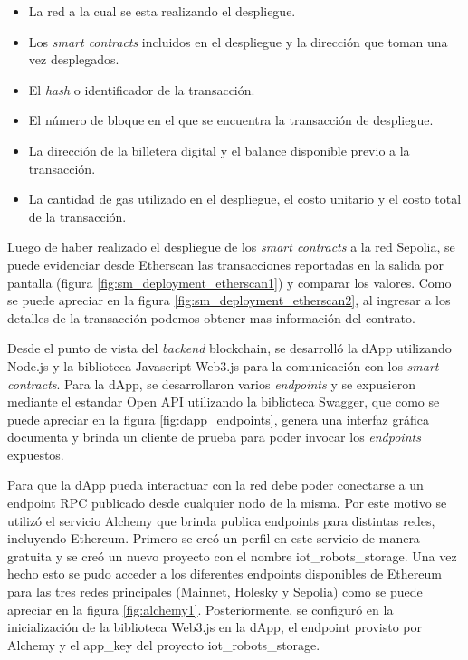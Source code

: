 \begin{itemize}
	\item La red a la cual se esta realizando el despliegue.
	\item Los \textit{smart contracts} incluidos en el despliegue y la dirección que toman una vez desplegados. 
	\item El \textit{hash} o identificador de la transacción.
	\item El número de bloque en el que se encuentra la transacción de despliegue.
	\item La dirección de la billetera digital y el balance disponible previo a la transacción.
	\item La cantidad de gas utilizado en el despliegue, el costo unitario y el costo total de la transacción.
\end{itemize}

Luego de haber realizado el despliegue de los \textit{smart contracts} a la red Sepolia, se puede evidenciar desde Etherscan las transacciones reportadas en la salida por pantalla (figura \ref{fig:sm_deployment_etherscan1}) y comparar los valores. Como se puede apreciar en la figura \ref{fig:sm_deployment_etherscan2}, al ingresar a los detalles de la transacción podemos obtener mas información del contrato.


Desde el punto de vista del \textit{backend} blockchain, se desarrolló la dApp utilizando Node.js y la biblioteca Javascript Web3.js para la comunicación con los \textit{smart contracts}. Para la dApp, se desarrollaron varios \textit{endpoints} y se expusieron mediante el estandar Open API \citep{open_api} utilizando la biblioteca Swagger, que como se puede apreciar en la figura \ref{fig:dapp_endpoints}, genera una interfaz gráfica documenta y brinda un cliente de prueba para poder invocar los \textit{endpoints} expuestos.


Para que la dApp pueda interactuar con la red debe poder conectarse a un endpoint RPC publicado desde cualquier nodo de la misma. Por este motivo se utilizó el servicio Alchemy que brinda publica endpoints para distintas redes, incluyendo Ethereum. Primero se creó un perfil en este servicio de manera gratuita y se creó un nuevo proyecto con el nombre iot\_robots\_storage. Una vez hecho esto se pudo acceder a los diferentes endpoints disponibles de Ethereum para las tres redes principales (Mainnet, Holesky y Sepolia) como se puede apreciar en la figura \ref{fig:alchemy1}. Posteriormente, se configuró en la inicialización de la biblioteca Web3.js en la dApp, el endpoint provisto por Alchemy y el app\_key del proyecto iot\_robots\_storage. 

